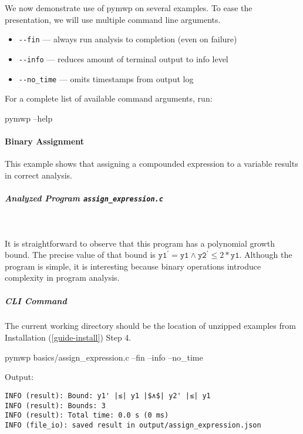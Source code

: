 We now demonstrate use of pymwp on several examples.
To ease the presentation, we will use multiple command line arguments.

\begin{itemize}
\item \texttt{-\/-fin} --- always run analysis to completion (even on failure)
\item \texttt{-\/-info} --- reduces amount of terminal output to info level
\item \texttt{-\/-no\_time} --- omits timestamps from output log
\end{itemize}

For a complete list of available command arguments, run:

\begin{console}[label={lst:help-cmd}]
pymwp --help
\end{console}


\paragraph{Binary Assignment}\label{binary-assignment}
This example shows that assigning a compounded expression to a variable results in correct analysis.

\subparagraph*{Analyzed Program \texttt{assign\_expression.c}}\mbox{}\\

\begin{minipage}{\textwidth}

\end{minipage}

It is straightforward to observe that this program has a polynomial growth bound.
The precise value of that bound is \(\texttt{y1}^\prime = \texttt{y1} \land \texttt{y2}^\prime \leq 2 * \texttt{y1}\).
Although the program is simple, it is interesting because binary operations introduce complexity in program analysis.

\subparagraph*{CLI Command}
The current working directory should be the location of unzipped examples from Installation (\autoref{guide-install}) Step 4.

\begin{console}[label={lst:ex1-run}]
pymwp basics/assign_expression.c --fin --info --no_time
\end{console}

Output:

\begin{lstlisting}[label={lst:ex-output}]
INFO (result): Bound: y1' |≤| y1 |$∧$| y2' |≤| y1
INFO (result): Bounds: 3
INFO (result): Total time: 0.0 s (0 ms)
INFO (file_io): saved result in output/assign_expression.json
\end{lstlisting}

